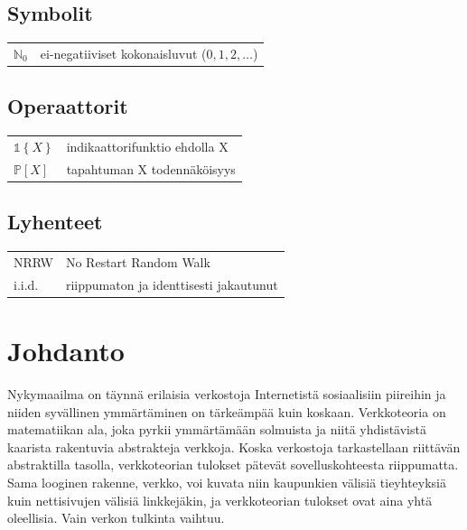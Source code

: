 \documentclass[finnish, 12pt, a4paper, sci, utf8, pdfa]{aaltothesis}
\newcommand{\N}{\mathbb{N}}
\newcommand{\indicator}{\mathopen{\mathds{1}}}
\newcommand*{\prob}{\mathbb{P}}
\begin{document}
\thesistableofcontents



\subsection*{Symbolit}

\begin{tabular}{ll}
$\N_{0}$  & ei-negatiiviset kokonaisluvut (\( 0, 1, 2, \ldots \))  \\
\end{tabular}

\subsection*{Operaattorit}

\begin{tabular}{ll}
   $ \indicator \left\{ X \right\} $               & indikaattorifunktio ehdolla X\\
   $ \prob \left[ X \right] $                      & tapahtuman X todennäköisyys\\
\end{tabular}

\subsection*{Lyhenteet}

\begin{tabular}{ll}
NRRW       & No Restart Random Walk\\
i.i.d.     & riippumaton ja identtisesti jakautunut\\
\end{tabular}


\cleardoublepage

\section{Johdanto}

\thispagestyle{empty}

Nykymaailma on täynnä erilaisia verkostoja Internetistä sosiaalisiin piireihin ja niiden syvällinen ymmärtäminen on tärkeämpää kuin koskaan. Verkkoteoria on matematiikan ala, 
joka pyrkii ymmärtämään solmuista ja niitä yhdistävistä kaarista rakentuvia abstrakteja verkkoja. Koska verkostoja tarkastellaan riittävän abstraktilla tasolla, verkkoteorian 
tulokset pätevät sovelluskohteesta riippumatta. Sama looginen rakenne, verkko, voi kuvata niin kaupunkien välisiä tieyhteyksiä kuin nettisivujen 
välisiä linkkejäkin, ja verkkoteorian tulokset ovat aina yhtä oleellisia. Vain verkon tulkinta vaihtuu. 
\end{document}
